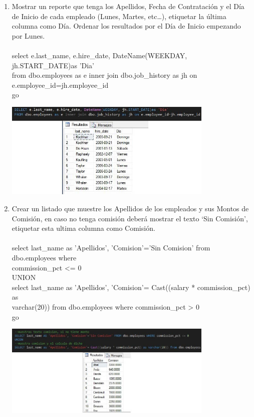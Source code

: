 \begin{enumerate}[1.]
	\item Mostrar un reporte que tenga los Apellidos, Fecha de Contrataci\'on y el D\'ia de Inicio de cada empleado (Lunes, Martes, etc…), etiquetar la \'ultima columna como D\'ia. Ordenar los resultados por el D\'ia de Inicio empezando por Lunes.
	\\
	\\select e.last\_name, e.hire\_date, DateName(WEEKDAY, jh.START\_DATE)as 'Dia' 
	\\from dbo.employees as e inner join dbo.job\_history as jh on 
	\\e.employee\_id=jh.employee\_id
	\\go
	\\
	\begin{center}
	\includegraphics[width=10cm]{./Imagenes/img03} 
	\end{center}

	\item Crear un listado que muestre los Apellidos de los empleados y sus Montos de Comisión, en caso no tenga comisi\'on deber\'a mostrar el texto ‘Sin Comisi\'on’, etiquetar esta ultima columna como Comisi\'on.	
	\\
	\\select last\_name as 'Apellidos', 'Comision'='Sin Comision' from dbo.employees where 
	\\commission\_pct <= 0 
	\\UNION
	\\select last\_name as 'Apellidos', 'Comision'= Cast((salary * commission\_pct) as 	
	\\varchar(20)) from dbo.employees where commission\_pct > 0
	\\go
	\\
	\begin{center}
	\includegraphics[width=10cm]{./Imagenes/img04} 
	\end{center}


\end{enumerate}
